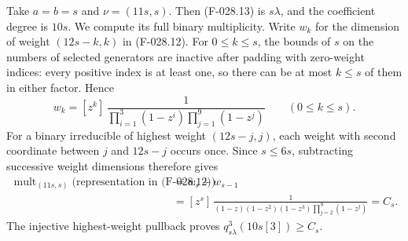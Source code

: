 Take \(a=b=s\) and \(\nu=(11s,s)\).
Then (F-028.13) is \(s\lambda\), and the coefficient
degree is \(10s\). We compute its full binary multiplicity.
Write \(w_k\) for the dimension of weight
\((12s-k,k)\) in (F-028.12). For \(0\leq k\leq s\),
the bounds of \(s\) on the numbers of selected generators
are inactive after padding with zero-weight indices:
every positive index is at least one, so there can be
at most \(k\leq s\) of them in either factor. Hence
\[
 w_k=[z^k]\,
       \frac1{\prod_{i=1}^{3}(1-z^i)
                      \prod_{j=1}^{9}(1-z^j)}
                    \qquad(0\leq k\leq s).
                                                               \tag{F-028.14}
\]
For a binary irreducible of highest weight
\((12s-j,j)\), each weight with second coordinate
between \(j\) and \(12s-j\) occurs once.
Since \(s\leq6s\), subtracting successive weight
dimensions therefore gives
\[
\begin{aligned}
\operatorname{mult}_{(11s,s)}\bigl(\text{representation in (F-028.12)}\bigr)
      &=w_s-w_{s-1}\\
      &=[z^s]\,
       \frac1{(1-z)(1-z^2)(1-z^3)
                            \prod_{j=2}^{9}(1-z^j)}
      =C_s.
\end{aligned}
                                                               \tag{F-028.15}
\]
The injective highest-weight pullback proves
\(q^3_{s\lambda}(10s[3])\geq C_s\).

